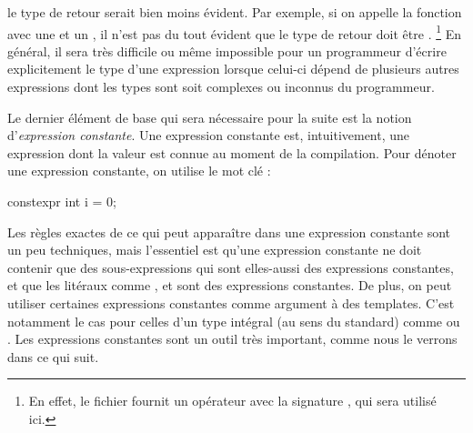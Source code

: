 le type de retour serait bien moins évident. Par exemple, si on appelle la
fonction  avec une  et un , il
n'est pas du tout évident que le type de retour doit être .
\footnote{
    En effet, le fichier  fournit un opérateur avec la signature
    , qui sera utilisé ici.
}
En général, il sera très difficile ou même impossible pour un programmeur
d'écrire explicitement le type d'une expression lorsque celui-ci dépend de
plusieurs autres expressions dont les types sont soit complexes ou inconnus
du programmeur.

Le dernier élément de base qui sera nécessaire pour la suite est la notion
d'\textit{expression constante}. Une expression constante est, intuitivement,
une expression dont la valeur est connue au moment de la compilation. Pour
dénoter une expression constante, on utilise le mot clé :
\begin{cpp}
    constexpr int i = 0;
\end{cpp}

Les règles exactes de ce qui peut apparaître dans une expression constante
sont un peu techniques, mais l'essentiel est qu'une expression constante ne
doit contenir que des sous-expressions qui sont elles-aussi des expressions
constantes, et que les litéraux comme ,  et 
sont des expressions constantes. De plus, on peut utiliser certaines
expressions constantes comme argument à des templates. C'est notamment le
cas pour celles d'un type intégral (au sens du standard) comme 
ou . Les expressions constantes sont un outil très important,
comme nous le verrons dans ce qui suit.


